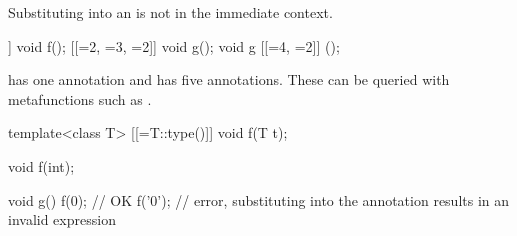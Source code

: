 \pnum
Substituting into an 
is not in the immediate context.
\begin{example}
\begin{codeblock}
[[=1]] void f();
[[=2, =3, =2]] void g();
void g [[=4, =2]] ();
\end{codeblock}
 has one annotation
and  has five annotations.
These can be queried with metafunctions
such as .
\end{example}
\begin{example}
\begin{codeblock}
template<class T>
  [[=T::type()]] void f(T t);

void f(int);

void g() {
  f(0);         // OK
  f('0');       // error, substituting into the annotation results in an invalid expression
}
\end{codeblock}
\end{example}

%
